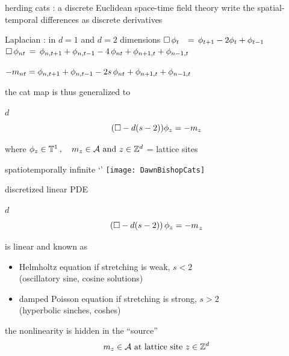 \begin{frame}{herding cats : a discrete Euclidean space-time field theory}
write the spatial-temporal differences as discrete derivatives
\begin{block}{Laplacian : in $d=1$ and $d=2$ dimensions}
\(
\Box\,\phi_t \;\;\,=\, \phi_{t+1} - 2\phi_{t} + \phi_{t-1}
\)\\ \(
\Box\,\phi_{nt} \,=\, \phi_{n,t+1} + \phi_{n,t-1}
- 4 \, \phi_{nt} + \phi_{n+1,t} + \phi_{n-1, t}
\)
\end{block}
\(
-{m_{n t}}
 =
\phi_{n,t+1} + \phi_{n,t-1} - 2s \, \phi_{n t} + \phi_{n+1,t} + \phi_{n-1, t}
\) %

\bigskip

the cat map is thus generalized  to
\begin{block}{$d$\dmn\ \catlatt}
\[
 (\Box - d(s-2))\phi_{z} = - m_z
\] %

\medskip

\end{block}

\bigskip

where
\(
  \phi_{z} \in  \mathbb{T}^{1}
    \,, \quad
  {\ensuremath{m_{z}}} \in \mathcal{A}
    \mbox{  and  }
  z\in \mathbb{Z}^{d}
\) = lattice sites
\end{frame}

\begin{frame}{spatiotemporally infinite `\catlatt'}
\hfill\texttt{[image: DawnBishopCats]}
\end{frame}

\begin{frame}{discretized linear PDE}
\begin{block}{$d$\dmn\ \catlatt}
{\Large
\[
 (\Box -d(s-2))\,\phi_{z} = - {m_{}}_z
\] %
}
\end{block}

\bigskip

is linear and known as
\begin{itemize}
\item {\color{blue}Helmholtz} equation if stretching is weak, $s<2$ \\
(oscillatory sine, cosine solutions)
\item damped {\color{blue}Poisson} equation if stretching is strong, $s>2$ \\
(hyperbolic sinches, coshes)
\end{itemize}
the nonlinearity is hidden in the ``source''
\[
  {m_{z}} \in \mathcal{A}
    \mbox{  at lattice site  }
  z\in \mathbb{Z}^{d}
\]
\end{frame}

